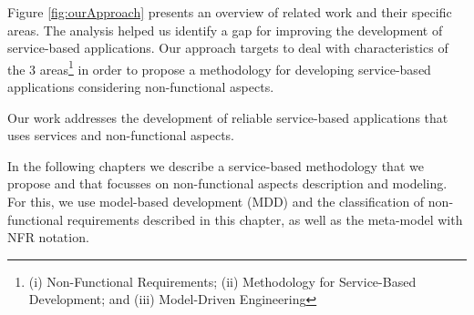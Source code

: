  
Figure \ref{fig:ourApproach} presents an overview of related work and their
specific areas. The analysis helped us identify a gap for improving the development of service-based
applications. Our approach targets to deal with characteristics of the 3
areas\footnote{(i) Non-Functional Requirements; (ii) Methodology for Service-Based Development;
and (iii) Model-Driven Engineering} in order to propose a methodology for
developing service-based applications considering non-functional aspects.


Our work addresses the development of reliable service-based applications that
uses services and non-functional aspects.


In the following chapters we describe a service-based  methodology that
we propose and that focusses on non-functional aspects description and modeling.
For this, we use model-based development (MDD) and the classification of non-functional requirements
described in this chapter, as well as the meta-model with NFR notation.     





